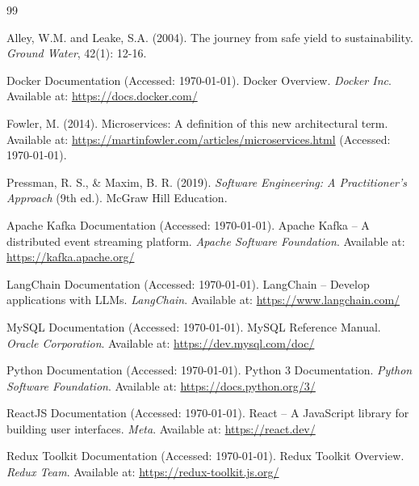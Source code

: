 \documentclass[12pt, a4paper]{report}
\begin{document}
\clearpage %
\begin{thebibliography}{99} %


 Alley, W.M. and Leake, S.A. (2004). The journey from safe yield to sustainability. \textit{Ground Water}, 42(1): 12-16.

 Docker Documentation (Accessed: \today). Docker Overview. \textit{Docker Inc}. Available at: \url{https://docs.docker.com/}

 Fowler, M. (2014). Microservices: A definition of this new architectural term. Available at: \url{https://martinfowler.com/articles/microservices.html} (Accessed: \today).

 Pressman, R. S., & Maxim, B. R. (2019). \textit{Software Engineering: A Practitioner's Approach} (9th ed.). McGraw Hill Education.


 Apache Kafka Documentation (Accessed: \today). Apache Kafka – A distributed event streaming platform. \textit{Apache Software Foundation}. Available at: \url{https://kafka.apache.org/}

 LangChain Documentation (Accessed: \today). LangChain – Develop applications with LLMs. \textit{LangChain}. Available at: \url{https://www.langchain.com/}

 MySQL Documentation (Accessed: \today). MySQL Reference Manual. \textit{Oracle Corporation}. Available at: \url{https://dev.mysql.com/doc/}

 Python Documentation (Accessed: \today). Python 3 Documentation. \textit{Python Software Foundation}. Available at: \url{https://docs.python.org/3/}

 ReactJS Documentation (Accessed: \today). React – A JavaScript library for building user interfaces. \textit{Meta}. Available at: \url{https://react.dev/}

 Redux Toolkit Documentation (Accessed: \today). Redux Toolkit Overview. \textit{Redux Team}. Available at: \url{https://redux-toolkit.js.org/}


\end{thebibliography}
\end{document}
